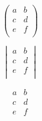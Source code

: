 \documentclass{article} %
\begin{document}
\[
    \begin{pmatrix}
        a&b\\
        c&d\\
        e&f\\
        
    \end{pmatrix}
\]

\[
    \begin{vmatrix}
        a&b\\
        c&d\\
        e&f\\
        
    \end{vmatrix}
\]

\[
    \begin{matrix}
        a&b\\
        c&d\\
        e&f\\
        
    \end{matrix}
\]
\end{document}
